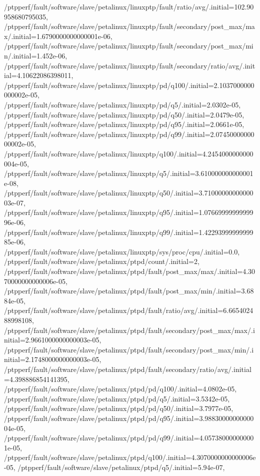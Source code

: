 {    /ptpperf/fault/software/slave/petalinux/linuxptp/fault/ratio/avg/.initial=102.90958680795035,
    /ptpperf/fault/software/slave/petalinux/linuxptp/fault/secondary/post_max/max/.initial=1.6790000000000001e-06,
    /ptpperf/fault/software/slave/petalinux/linuxptp/fault/secondary/post_max/min/.initial=1.452e-06,
    /ptpperf/fault/software/slave/petalinux/linuxptp/fault/secondary/ratio/avg/.initial=4.10622086398011,
    /ptpperf/fault/software/slave/petalinux/linuxptp/pd/q100/.initial=2.1037000000000002e-05,
    /ptpperf/fault/software/slave/petalinux/linuxptp/pd/q5/.initial=2.0302e-05,
    /ptpperf/fault/software/slave/petalinux/linuxptp/pd/q50/.initial=2.0479e-05,
    /ptpperf/fault/software/slave/petalinux/linuxptp/pd/q95/.initial=2.0661e-05,
    /ptpperf/fault/software/slave/petalinux/linuxptp/pd/q99/.initial=2.0745000000000002e-05,
    /ptpperf/fault/software/slave/petalinux/linuxptp/q100/.initial=4.2454000000000004e-05,
    /ptpperf/fault/software/slave/petalinux/linuxptp/q5/.initial=3.610000000000001e-08,
    /ptpperf/fault/software/slave/petalinux/linuxptp/q50/.initial=3.7100000000000003e-07,
    /ptpperf/fault/software/slave/petalinux/linuxptp/q95/.initial=1.0766999999999996e-06,
    /ptpperf/fault/software/slave/petalinux/linuxptp/q99/.initial=1.4229399999999985e-06,
    /ptpperf/fault/software/slave/petalinux/linuxptp/sys/proc/cpu/.initial=0.0,
    /ptpperf/fault/software/slave/petalinux/ptpd/count/.initial=2,
    /ptpperf/fault/software/slave/petalinux/ptpd/fault/post_max/max/.initial=4.3070000000000006e-05,
    /ptpperf/fault/software/slave/petalinux/ptpd/fault/post_max/min/.initial=3.6884e-05,
    /ptpperf/fault/software/slave/petalinux/ptpd/fault/ratio/avg/.initial=6.665402488998108,
    /ptpperf/fault/software/slave/petalinux/ptpd/fault/secondary/post_max/max/.initial=2.9661000000000003e-05,
    /ptpperf/fault/software/slave/petalinux/ptpd/fault/secondary/post_max/min/.initial=2.1748000000000003e-05,
    /ptpperf/fault/software/slave/petalinux/ptpd/fault/secondary/ratio/avg/.initial=4.398886854141395,
    /ptpperf/fault/software/slave/petalinux/ptpd/pd/q100/.initial=4.0802e-05,
    /ptpperf/fault/software/slave/petalinux/ptpd/pd/q5/.initial=3.5342e-05,
    /ptpperf/fault/software/slave/petalinux/ptpd/pd/q50/.initial=3.7977e-05,
    /ptpperf/fault/software/slave/petalinux/ptpd/pd/q95/.initial=3.9883000000000004e-05,
    /ptpperf/fault/software/slave/petalinux/ptpd/pd/q99/.initial=4.057380000000001e-05,
    /ptpperf/fault/software/slave/petalinux/ptpd/q100/.initial=4.3070000000000006e-05,
    /ptpperf/fault/software/slave/petalinux/ptpd/q5/.initial=5.94e-07,
}
